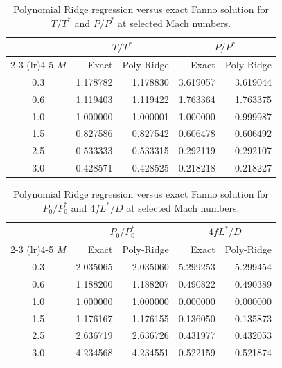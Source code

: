 \documentclass[11pt,a4paper]{report}
\begin{document}
\begin{table}[htbp]
\centering
\small
\setlength{\tabcolsep}{6pt}
\renewcommand{\arraystretch}{1.1}
\caption{Polynomial Ridge regression versus exact Fanno solution for $T/T^*$ and $P/P^*$ at selected Mach numbers.}
\label{tab:ml_vs_exact_1}
\begin{tabular}{@{} c rr rr @{}}
\toprule
 & \multicolumn{2}{c}{$T/T^*$} & \multicolumn{2}{c}{$P/P^*$} \\
\cmidrule(lr){2-3} \cmidrule(lr){4-5}
$M$ & {Exact} & {Poly-Ridge} & {Exact} & {Poly-Ridge} \\
\midrule
0.3 & 1.178782 & 1.178830 & 3.619057 & 3.619044 \\
0.6 & 1.119403 & 1.119422 & 1.763364 & 1.763375 \\
1.0 & 1.000000 & 1.000001 & 1.000000 & 0.999987 \\
1.5 & 0.827586 & 0.827542 & 0.606478 & 0.606492 \\
2.5 & 0.533333 & 0.533315 & 0.292119 & 0.292107 \\
3.0 & 0.428571 & 0.428525 & 0.218218 & 0.218227 \\
\bottomrule
\end{tabular}
\end{table}

\begin{table}[htbp]
\centering
\small
\setlength{\tabcolsep}{6pt}
\renewcommand{\arraystretch}{1.1}
\caption{Polynomial Ridge regression versus exact Fanno solution for $P_0/P_0^*$ and $4fL^*/D$ at selected Mach numbers.}
\label{tab:ml_vs_exact_2}
\begin{tabular}{@{} c rr rr @{}}
\toprule
 & \multicolumn{2}{c}{$P_0/P_0^*$} & \multicolumn{2}{c}{$4fL^*/D$} \\
\cmidrule(lr){2-3} \cmidrule(lr){4-5}
$M$ & {Exact} & {Poly-Ridge} & {Exact} & {Poly-Ridge} \\
\midrule
0.3 & 2.035065 & 2.035060 & 5.299253 & 5.299454 \\
0.6 & 1.188200 & 1.188207 & 0.490822 & 0.490389 \\
1.0 & 1.000000 & 1.000000 & 0.000000 & 0.000000 \\
1.5 & 1.176167 & 1.176155 & 0.136050 & 0.135873 \\
2.5 & 2.636719 & 2.636726 & 0.431977 & 0.432053 \\
3.0 & 4.234568 & 4.234551 & 0.522159 & 0.521874 \\
\bottomrule
\end{tabular}
\end{table}
\end{document}
